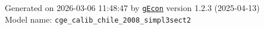 \documentclass[10pt,a4paper]{article}
\numberwithin{equation}{section}
\begin{document}
\begin{landscape}
\begin{flushleft}{\large
Generated  on 2026-03-06 11:48:47 by \href{http://gecon.r-forge.r-project.org/}{\texttt{gEcon}} version 1.2.3 (2025-04-13)\\
Model name: \verb+cge_calib_chile_2008_simpl3sect2+
}\end{flushleft}


\end{landscape}

\end{document}
